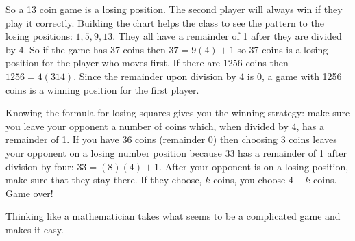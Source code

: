 \documentclass[12pt]{article}
\begin{document}
So a 13 coin game is a losing position. The second player will 
always win if they play it correctly. Building the chart helps the
class to see the pattern to the losing positions: $1, 5, 9, 13$.
They all have a remainder of 1 after they are divided by 4. So if
the game has 37 coins then $37=9(4)+1$ so 37 coins is a losing 
position for the player who moves first. If there are 1256 coins
then $1256=4(314)$. Since the remainder upon division by 4
is 0, a game with 1256 coins is a winning position for the first 
player.

Knowing the formula for losing squares gives you the winning 
strategy: make sure you leave your opponent a number of coins
which, when divided by 4, has a remainder of 1. If you have 36
coins (remainder 0) then choosing 3 coins leaves your opponent 
on a losing number position because 33 has a remainder
of 1 after division by four: $33=(8)(4)+1$. After your opponent 
is on a losing position, make sure that they stay there. If they 
choose, $k$ coins, you choose $4-k$ coins. Game over!

Thinking like a mathematician takes what seems to be a 
complicated game and makes it easy.
\end{document}
